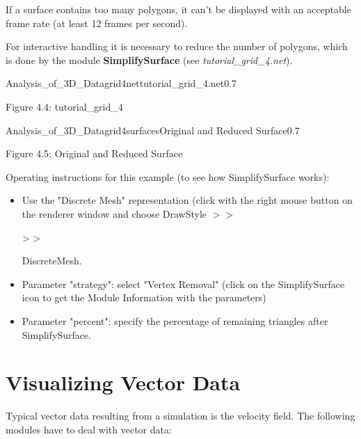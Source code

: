 If a surface contains too many polygons, it can't be displayed with an acceptable 
frame rate (at least 12 frames per second). 

For interactive handling it is necessary to reduce the number of polygons, which is 
done by the module {\bf SimplifySurface} (see {\it tutorial\_grid\_4.net}). 


\begin{covimg}{Analysis_of_3D_Data}{grid4net}{tutorial\_grid\_4.net}{0.7}\end{covimg}
\begin{htmlonly}
Figure 4.4: tutorial_grid_4
\vspace{0.5cm}
\end{htmlonly}

\begin{covimg}{Analysis_of_3D_Data}{grid4surfaces}{Original and Reduced Surface}{0.7}\end{covimg}
\begin{htmlonly}
Figure 4.5: Original and Reduced Surface
\vspace{0.5cm}
\end{htmlonly} 

Operating instructions for this example (to see how SimplifySurface works):
\begin{itemize}
\item Use the "Discrete Mesh" representation (click with the right mouse button on the
renderer window and choose DrawStyle \latexonly $>>$ \endlatexonly \begin{htmlonly}
> >\end{htmlonly} DiscreteMesh.
\item Parameter "strategy": select "Vertex Removal" (click on the SimplifySurface icon
to get the Module Information with the parameters)
\item Parameter "percent": specify the percentage of remaining triangles after
SimplifySurface.
\end{itemize}



\clearpage
\section{Visualizing Vector Data}


Typical vector data resulting from a simulation is the velocity field. The following modules have to deal with vector
data:

\vspace{0.5cm}

